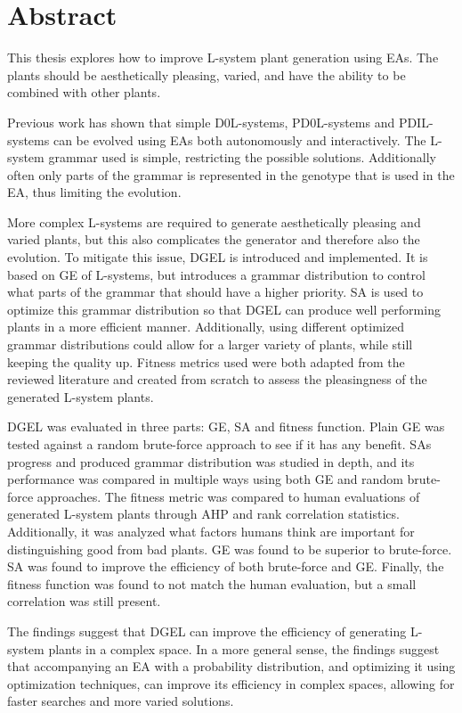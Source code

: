 \chapter*{Abstract}

This thesis explores how to improve L-system plant generation using \glspl{EA}.
The plants should be aesthetically pleasing, varied, and have the ability to be combined with other plants.

Previous work has shown that simple \glspl{D0L-system}, \glspl{PD0L-system} and \glspl{PDIL-system} can be evolved using \glspl{EA} both autonomously and interactively.
The \gls{L-system} grammar used is simple, restricting the possible solutions.
Additionally often only parts of the grammar is represented in the genotype that is used in the \gls{EA}, thus limiting the evolution.

More complex \glspl{L-system} are required to generate aesthetically pleasing and varied plants, but this also complicates the generator and therefore also the evolution.
To mitigate this issue, \gls{DGEL} is introduced and implemented.
It is based on \gls{GE} of \glspl{L-system}, but introduces a grammar distribution to control what parts of the grammar that should have a higher priority.
\Gls{SA} is used to optimize this grammar distribution so that \gls{DGEL} can produce well performing plants in a more efficient manner.
Additionally, using different optimized grammar distributions could allow for a larger variety of plants, while still keeping the quality up.
Fitness metrics used were both adapted from the reviewed literature and created from scratch to assess the pleasingness of the generated L-system plants.

\Gls{DGEL} was evaluated in three parts: \gls{GE}, \gls{SA} and fitness function.
Plain \gls{GE} was tested against a random brute-force approach to see if it has any benefit.
\Gls{SA}s progress and produced grammar distribution was studied in depth, and its performance was compared in multiple ways using both \gls{GE} and random brute-force approaches.
The fitness metric was compared to human evaluations of generated L-system plants through \gls{AHP} and rank correlation statistics.
Additionally, it was analyzed what factors humans think are important for distinguishing good from bad plants.
\Gls{GE} was found to be superior to brute-force.
\Gls{SA} was found to improve the efficiency of both brute-force and \gls{GE}.
Finally, the fitness function was found to not match the human evaluation, but a small correlation was still present.

The findings suggest that \gls{DGEL} can improve the efficiency of generating L-system plants in a complex space. In a more general sense, the findings suggest that accompanying an EA with a probability distribution, and optimizing it using optimization techniques, can improve its efficiency in complex spaces, allowing for faster searches and more varied solutions.

\hypersetup{pageanchor=false}
